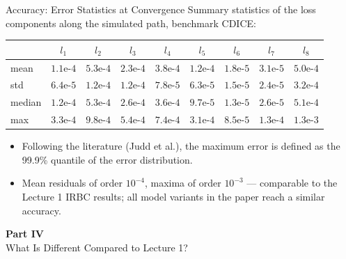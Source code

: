 \documentclass[aspectratio=169,11pt]{beamer}
\newcommand{\emphc}[1]{\textcolor{harvardcrimson}{#1}}
\begin{document}
\begin{frame}{Accuracy: Error Statistics at Convergence}
Summary statistics of the loss components along the simulated path, benchmark CDICE:

\vspace{0.3cm}
\begin{center}
\small
\begin{tabular}{lcccccccc}
\toprule
 & $l_1$ & $l_2$ & $l_3$ & $l_4$ & $l_5$ & $l_6$ & $l_7$ & $l_8$ \\
\midrule
mean & $1.1\text{e-}4$ & $5.3\text{e-}4$ & $2.3\text{e-}4$ & $3.8\text{e-}4$ & $1.2\text{e-}4$ & $1.8\text{e-}5$ & $3.1\text{e-}5$ & $5.0\text{e-}4$ \\
std & $6.4\text{e-}5$ & $1.2\text{e-}4$ & $1.2\text{e-}4$ & $7.8\text{e-}5$ & $6.3\text{e-}5$ & $1.5\text{e-}5$ & $2.4\text{e-}5$ & $3.2\text{e-}4$ \\
median & $1.2\text{e-}4$ & $5.3\text{e-}4$ & $2.6\text{e-}4$ & $3.6\text{e-}4$ & $9.7\text{e-}5$ & $1.3\text{e-}5$ & $2.6\text{e-}5$ & $5.1\text{e-}4$ \\
max & $3.3\text{e-}4$ & $9.8\text{e-}4$ & $5.4\text{e-}4$ & $7.4\text{e-}4$ & $3.1\text{e-}4$ & $8.5\text{e-}5$ & $1.3\text{e-}4$ & $1.3\text{e-}3$ \\
\bottomrule
\end{tabular}
\end{center}

\vspace{0.3cm}
\begin{itemize}
    \item Following the literature (Judd et al.), the \emphc{maximum error} is defined as the 99.9\% quantile of the error distribution.
    \item Mean residuals of order $10^{-4}$, maxima of order $10^{-3}$ --- comparable to the Lecture 1 IRBC results; all model variants in the paper reach a similar accuracy.
\end{itemize}
\end{frame}



\begin{frame}{}
\vfill
\begin{center}
{\Huge \textcolor{uzhblue}{\textbf{Part IV}}}\\[12pt]
{\LARGE What Is Different Compared to Lecture 1?}
\end{center}
\vfill
\end{frame}
\end{document}
